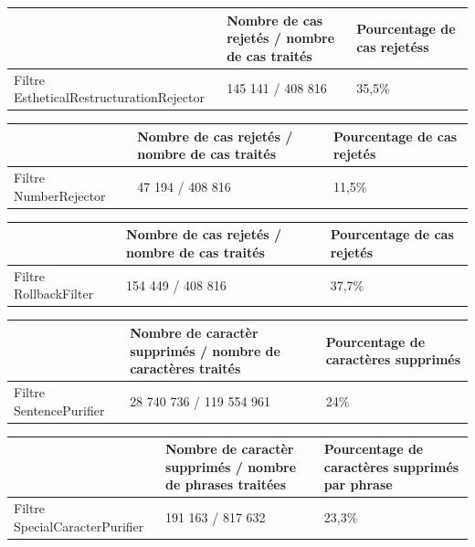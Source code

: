 \documentclass[11pt]{article}
\begin{document}
\begin{center}
\begin{tabular}{|M{6cm}|M{5cm}|M{6cm}|}
   \hline
    \, &Nombre de cas rejet\'{e}s / nombre de cas trait\'{e}s & Pourcentage de cas rejet\'{e}ss \tabularnewline
   \hline
    Filtre EstheticalRestructurationRejector & 145 141 / 408 816 & 35,5\% \tabularnewline
   \hline
\end{tabular}
\end{center}



\begin{center}
\begin{tabular}{|M{4cm}|M{5cm}|M{6cm}|}
   \hline
    \, &Nombre de cas rejet\'{e}s / nombre de cas trait\'{e}s & Pourcentage de cas rejet\'{e}s \tabularnewline
   \hline
    Filtre NumberRejector & 47 194 / 408 816 & 11,5\% \tabularnewline
   \hline
\end{tabular}
\end{center}




\begin{center}
\begin{tabular}{|M{4cm}|M{5cm}|M{6cm}|}
   \hline
    \, &Nombre de cas rejet\'{e}s / nombre de cas trait\'{e}s & Pourcentage de cas rejet\'{e}s \tabularnewline
   \hline
    Filtre RollbackFilter & 154 449 / 408 816 & 37,7\% \tabularnewline
   \hline
\end{tabular}
\end{center}



\begin{center}
\begin{tabular}{|M{4cm}|M{5cm}|M{6cm}|}
   \hline
    \, &Nombre de caract\`{e}r supprim\'{e}s / nombre de caract\`{e}res trait\'{e}s & Pourcentage de caract\`{e}res supprim\'{e}s \tabularnewline
   \hline
    Filtre SentencePurifier & 28 740 736 / 119 554 961 & 24\% \tabularnewline
   \hline
\end{tabular}
\end{center}



\begin{center}
\begin{tabular}{|M{4cm}|M{5cm}|M{6cm}|}
   \hline
    \, &Nombre de caract\`{e}r supprim\'{e}s / nombre de phrases trait\'{e}es & Pourcentage de caract\`{e}res supprim\'{e}s par phrase\tabularnewline
   \hline
    Filtre SpecialCaracterPurifier & 191 163 / 817 632 & 23,3\% \tabularnewline
   \hline
\end{tabular}
\end{center}
\end{document}
